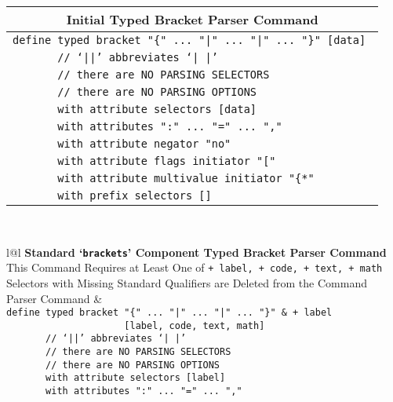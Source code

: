 \documentclass[12pt]{article}
\makeatletter
\newcommand{\TT}[1]{{\tt \bfseries #1}}
\newcommand{\ttkey}[1]{\TT{#1}\index{#1@\TT{#1}}}
\makeatother
\begin{document}
\begin{center}\label{TOP-LEVEL-{}}
\begin{tabular}{l}
\multicolumn{1}{c}{\bf Initial Typed Bracket Parser Command}
\\\hline
\tt define typed bracket "\{" ... "|" ... "|" ... "\}" [data] \\
\tt ~~~~~~~// `||' abbreviates `| |' \\
\tt ~~~~~~~// there are NO PARSING SELECTORS \\
\tt ~~~~~~~// there are NO PARSING OPTIONS \\
\tt ~~~~~~~with attribute selectors [data] \\
\tt ~~~~~~~with attributes ":" ... "=" ... "," \\
\tt ~~~~~~~with attribute negator "no" \\
\tt ~~~~~~~with attribute flags initiator "[" \\
\tt ~~~~~~~with attribute multivalue initiator "\{*" \\
\tt ~~~~~~~with prefix selectors [] \\
\end{tabular}
\\[2ex]
\begin{tabular}{l@{\hspace*{0.4in}}l}
{\bf Standard `\ttkey{brackets}'\label{STANDARD-BRACKETS-2} Component
     Typed Bracket Parser Command}
\\[1ex]
{This Command Requires at Least One of {\tt + label, + code, + text, + math}} \\
{Selectors with Missing Standard Qualifiers are Deleted from the Command}
\\[1ex]
Parser Command				& 
\\\hline
\tt define typed bracket "\{" ...~"|" ...~"|" ...~"\}"   & \tt + label \\
\tt ~~~~~~~~~~~~~~~~~~~~~[label, code, text, math] \\
\tt ~~~~~~~// `||' abbreviates `| |' \\
\tt ~~~~~~~// there are NO PARSING SELECTORS \\
\tt ~~~~~~~// there are NO PARSING OPTIONS \\
\tt ~~~~~~~with attribute selectors [label] \\
\tt ~~~~~~~with attributes ":" ... "=" ... "," \\

\end{tabular}
\end{center}
\end{document}
